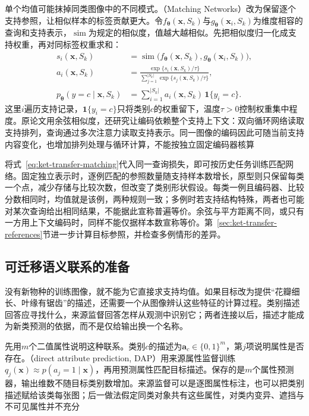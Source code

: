 单个均值可能抹掉同类图像中的不同模式。（Matching Networks）改为保留逐个支持参照，让相似样本的标签贡献更大。令$f_{\bm\theta}(\bm x,S_k)$与$g_{\bm\theta}(\bm x_i,S_k)$为维度相容的查询和支持表示，$\operatorname{sim}$为规定的相似度，值越大越相似。先把相似度归一化成支持权重，再对同标签权重求和：
\begin{align}
  s_i(\bm x,S_k)
  &=\operatorname{sim}\bigl(f_{\bm{\theta}}(\bm x,S_k),
       g_{\bm{\theta}}(\bm x_i,S_k)\bigr), \nonumber\\
  a_i(\bm x,S_k)
  &=\frac{\exp\{s_i(\bm x,S_k)/\tau\}}
  {\sum_{j=1}^{|S_k|}\exp\{s_j(\bm x,S_k)/\tau\}}, \nonumber\\
  p_{\bm{\theta}}(y=c\mid\bm x,S_k)
  &=\sum_{i=1}^{|S_k|}a_i(\bm x,S_k)\,\mathbf 1\{y_i=c\}.
  \label{eq:ket-transfer-matching}
\end{align}
这里$i$遍历支持记录，$\mathbf1\{y_i=c\}$只将类别$c$的权重留下，温度$\tau>0$控制权重集中程度。原论文用余弦相似度，还研究让编码依赖整个支持上下文：双向循环网络读取支持排列，查询通过多次注意力读取支持表示。同一图像的编码因此可随当前支持内容变化，也增加排列处理与循环计算，不能按独立固定编码器核算

将式~\eqref{eq:ket-transfer-matching}代入同一查询损失，即可按历史任务训练匹配网络。固定独立表示时，逐例匹配的参照数量随支持样本数增长，原型则只保留每类一个点，减少存储与比较次数，但改变了类别形状假设。每类一例且编码器、比较分数相同时，均值就是该例，两种规则一致；多例时若支持结构特殊，两者也可能对某次查询给出相同结果，不能据此宣称普遍等价。余弦与平方距离不同，或只有一方用上下文编码时，同样不能仅据样本数宣称等价。第~\ref{sec:ket-transfer-references}节进一步计算目标参照，并检查多例情形的差异。

\subsection{可迁移语义联系的准备}
\label{sec:ket-transfer-semantic-preparation}

没有新物种的训练图像，就不能为它直接求支持均值。如果目标改为提供“花瓣细长、叶缘有锯齿”的描述，还需要一个从图像辨认这些特征的计算过程。类别描述回答应寻找什么，来源监督回答怎样从观测中识别它；两者连接以后，描述才能成为新类预测的依据，而不是仅给输出换一个名称。

先用$m$个二值属性说明这种联系。类别$c$的描述为$\bm a_c\in\{0,1\}^m$，第$j$项说明属性是否存在。（direct attribute prediction, DAP）用来源属性监督训练$q_j(\bm x)\approx p(a_j=1\mid\bm x)$，再用预测属性匹配目标描述。保存的是$m$个属性预测器，输出维数不随目标类别数增加。来源监督可以是逐图属性标注，也可以把类别描述赋给该类每张图；后一做法假定同类对象共有这些属性，对类内变异、遮挡与不可见属性并不充分

